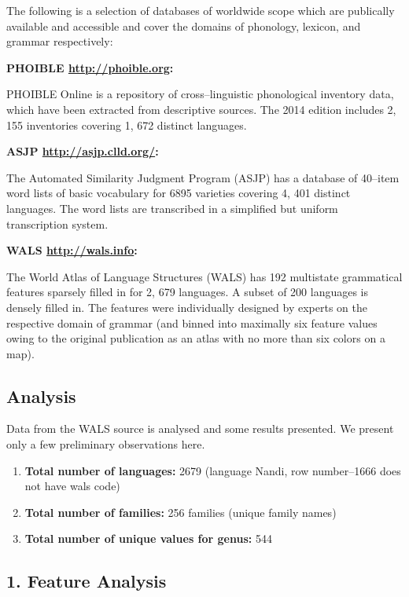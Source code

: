 The following is a selection of databases of worldwide scope which are publically available and accessible and cover the domains of phonology, lexicon, and grammar respectively:

\textbf{PHOIBLE \url{http://phoible.org}:}

PHOIBLE Online is a repository of cross–linguistic phonological inventory data, which have been extracted from descriptive sources. The 2014 edition includes 2, 155 inventories covering 1, 672 distinct languages.

\textbf{ASJP \url{http://asjp.clld.org/}:}

The Automated Similarity Judgment Program (ASJP) has a database of 40–item word lists of basic vocabulary for 6895 varieties covering 4, 401 distinct languages. The word lists are transcribed in a simplified but uniform transcription system.

\textbf{WALS \url{http://wals.info}:}

The World Atlas of Language Structures (WALS) has 192 multistate grammatical features sparsely filled in for 2, 679 languages. A subset of 200 languages is densely filled in. The features were individually designed by experts on the respective domain of grammar (and binned into maximally six feature values owing to the original publication as an atlas with no more than six colors on a map).


\subsection*{Analysis}

Data from the WALS source is analysed and some results presented. We present only a few preliminary observations here.

\begin{enumerate}[{\rm 1)}]
\itemsep=0pt
\item \textbf{Total number of languages:} 2679 (language Nandi, row number–1666 does not have wals code)

 \item \textbf{Total number of families:} 256 families (unique family names)

 \item \textbf{Total number of unique values for genus:} 544

\end{enumerate}


\subsection*{1. Feature Analysis}

